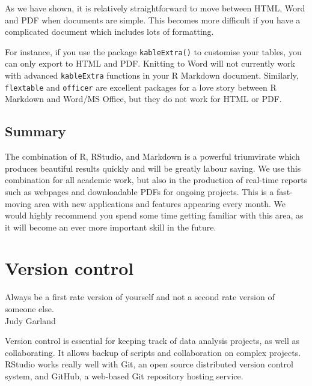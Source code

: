 \documentclass[
  12pt,
  krantz2]{krantz}
\renewenvironment{quote}{\begin{VF}}{\end{VF}}
\begin{document}
As we have shown, it is relatively straightforward to move between HTML, Word and PDF when documents are simple.
This becomes more difficult if you have a complicated document which includes lots of formatting.

For instance, if you use the package \texttt{kableExtra()} to customise your tables, you can only export to HTML and PDF.
Knitting to Word will not currently work with advanced \texttt{kableExtra} functions in your R Markdown document.
Similarly, \texttt{flextable} and \texttt{officer} are excellent packages for a love story between R Markdown and Word/MS Office, but they do not work for HTML or PDF.

\hypertarget{summary-4}{%
\section{Summary}\label{summary-4}}

The combination of R, RStudio, and Markdown is a powerful triumvirate which produces beautiful results quickly and will be greatly labour saving.
We use this combination for all academic work, but also in the production of real-time reports such as webpages and downloadable PDFs for ongoing projects.
This is a fast-moving area with new applications and features appearing every month.
We would highly recommend you spend some time getting familiar with this area, as it will become an ever more important skill in the future.

\hypertarget{chap14-h1}{%
\chapter{Version control}\label{chap14-h1}}


\begin{quote}
Always be a first rate version of yourself and not a second rate version of someone else.\\
Judy Garland
\end{quote}

Version control is essential for keeping track of data analysis projects, as well as collaborating.
It allows backup of scripts and collaboration on complex projects.
RStudio works really well with Git, an open source distributed version control system, and GitHub, a web-based Git repository hosting service.

\end{document}
